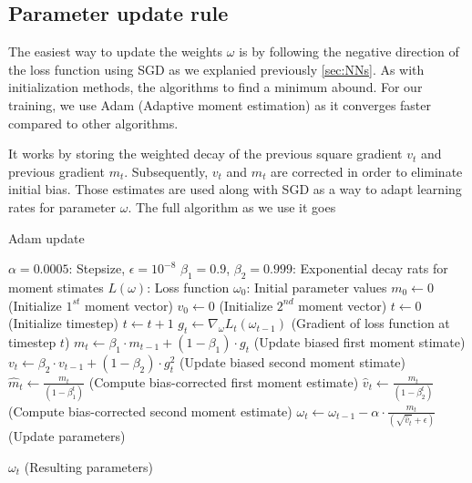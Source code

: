 \subsection{Parameter update rule}     
The easiest way to update the weights $\omega$ is by following the negative direction of the loss function using SGD as we explanied previously \ref{sec:NNs}. As with initialization methods, the algorithms to find a minimum abound. For our training, we use Adam (Adaptive moment estimation) \cite{kingma2014adam} as it converges faster compared to other algorithms. \

It works by storing the weighted decay of the previous square gradient $v_t$ and previous gradient $m_t$. Subsequently, $v_t$ and $m_t$ are corrected in order to eliminate initial bias. Those estimates are used along with SGD as a way to adapt learning rates for parameter $\omega$. The full algorithm  as we use it goes     

\begin{algorithm}
\caption{Adam update}
\label{Adamalg}
\begin{algorithmic}[2]
    \Require $\alpha = 0.0005 $: Stepsize, $\epsilon = 10^{-8}$ 
    \Require $\beta_1 = 0.9$, $\beta_2 = 0.999$: Exponential decay rats for moment stimates
    \Require $L ( \omega ) $: Loss function
    \Require $ \omega_0 $: Initial parameter values
    \State $m_0 \leftarrow 0$ (Initialize $1^{st}$ moment vector)
    \State $v_0 \leftarrow 0$ (Initialize $2^{nd}$ moment vector)
    \State $t \leftarrow 0$ (Initialize timestep)
        \State $t \leftarrow t+1$ 
        \State $g_t \leftarrow \nabla_{\omega} L_t ( \omega_{t-1} )$ (Gradient of loss function at timestep $t$)
        \State $m_t \leftarrow \beta_1 \cdot m_{t-1} + ( 1 -  \beta_1) \cdot g_t $ (Update biased first moment stimate)
        \State $v_t \leftarrow \beta_2 \cdot v_{t-1} + (1 - \beta_2) \cdot g_{t}^2 $ (Update biased second moment stimate)
        \State $\hat{m}_t \leftarrow \frac{m_t}{( 1 - \beta_{1}^{t} )}$  (Compute bias-corrected first moment estimate)
        \State $\hat{v}_t \leftarrow \frac{m_t}{( 1 - \beta_{2}^{t} )}$  (Compute bias-corrected second moment estimate)
        \State $\omega_t \leftarrow \omega_{t-1} - \alpha \cdot \frac{ \hat{m}_t }{ ( \sqrt{\hat{v}_t } + \epsilon ) } $ (Update parameters)

    \EndWhile
    
    \State \Return $\omega_t $ (Resulting parameters)   
\end{algorithmic}
\end{algorithm}

